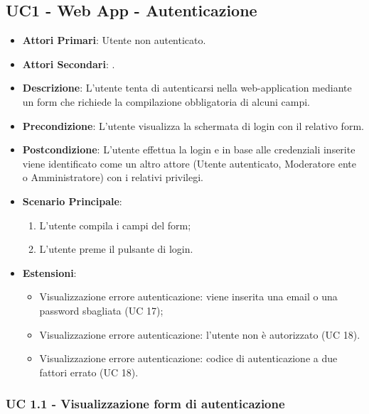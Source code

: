 	\subsection{UC1 - Web App - Autenticazione}
		
		
	\begin{itemize}
		\item \textbf{Attori Primari}: Utente non autenticato.
		\item \textbf{Attori Secondari}: .
		\item \textbf{Descrizione}: L'utente tenta di autenticarsi nella web-application mediante un form che richiede la compilazione obbligatoria di alcuni campi.
		\item \textbf{Precondizione}: L'utente visualizza la schermata di login con il relativo form.
		\item \textbf{Postcondizione}: L'utente effettua la login e in base alle credenziali inserite viene identificato come un altro attore (Utente autenticato, Moderatore ente o Amministratore) con i relativi privilegi.
		\item \textbf{Scenario Principale}:
		\begin{enumerate}
			\item L'utente compila i campi del form;
			\item L'utente preme il pulsante di login.
		\end{enumerate}
		\item \textbf{Estensioni}:
			\begin{itemize}
				\item Visualizzazione errore autenticazione: viene inserita una email o una password sbagliata (UC 17);
				\item Visualizzazione errore autenticazione: l'utente non è autorizzato (UC 18).
				\item Visualizzazione errore autenticazione: codice di autenticazione a due fattori errato (UC 18).
			\end{itemize}
	\end{itemize}
	

		\subsubsection{UC 1.1 - Visualizzazione form di autenticazione}

